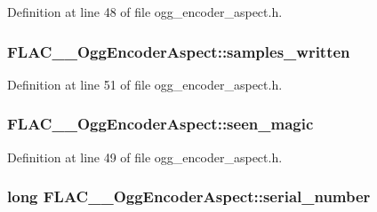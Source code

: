 Definition at line 48 of file ogg\+\_\+encoder\+\_\+aspect.\+h.

\subsubsection[{\texorpdfstring{samples\+\_\+written}{samples_written}}]{ F\+L\+A\+C\+\_\+\+\_\+\+Ogg\+Encoder\+Aspect\+::samples\+\_\+written}\hypertarget{struct_f_l_a_c_____ogg_encoder_aspect_afa019d3fb68ad30b8c7587b6d0997df3}{}\label{struct_f_l_a_c_____ogg_encoder_aspect_afa019d3fb68ad30b8c7587b6d0997df3}


Definition at line 51 of file ogg\+\_\+encoder\+\_\+aspect.\+h.

\subsubsection[{\texorpdfstring{seen\+\_\+magic}{seen_magic}}]{ F\+L\+A\+C\+\_\+\+\_\+\+Ogg\+Encoder\+Aspect\+::seen\+\_\+magic}\hypertarget{struct_f_l_a_c_____ogg_encoder_aspect_a75cfe6c22e1b1d561108fc8ce383c0ef}{}\label{struct_f_l_a_c_____ogg_encoder_aspect_a75cfe6c22e1b1d561108fc8ce383c0ef}


Definition at line 49 of file ogg\+\_\+encoder\+\_\+aspect.\+h.

\subsubsection[{\texorpdfstring{serial\+\_\+number}{serial_number}}]{\setlength{\rightskip}{0pt plus 5cm}long F\+L\+A\+C\+\_\+\+\_\+\+Ogg\+Encoder\+Aspect\+::serial\+\_\+number}\hypertarget{struct_f_l_a_c_____ogg_encoder_aspect_a89e40d82a35841dcfb5866f4eee98d5c}{}\label{struct_f_l_a_c_____ogg_encoder_aspect_a89e40d82a35841dcfb5866f4eee98d5c}


